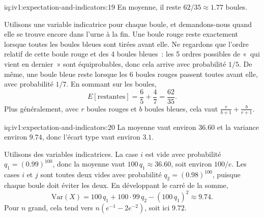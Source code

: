 \begin{solution}{iq:iv1:expectation-and-indicators:19}
En moyenne, il reste $62/35 \approx 1.77$ boules.

Utilisons une variable indicatrice pour chaque boule, et demandons-nous quand elle se trouve encore dans l'urne à la fin. Une boule rouge reste exactement lorsque toutes les boules bleues sont tirées avant elle. Ne regardons que
l'ordre relatif de cette boule rouge et des 4 boules bleues~: les 5 ordres possibles de «~qui vient en dernier~» sont équiprobables, donc cela arrive avec probabilité $1/5$. De même, une boule bleue reste lorsque les 6 boules rouges passent toutes avant elle, avec probabilité
$1/7$. En sommant sur les boules,
\[
E[\text{restantes}] = \frac{6}{5} + \frac{4}{7} = \frac{62}{35}.
\]
Plus généralement, avec $r$ boules rouges et $b$ boules bleues, cela vaut $\frac{r}{b+1} + \frac{b}{r+1}$.

\end{solution}

\begin{solution}{iq:iv1:expectation-and-indicators:20}
La moyenne vaut environ $36.60$ et la variance environ $9.74$, donc l'écart type vaut environ $3.1$.

Utilisons des variables indicatrices. La case $i$ est vide avec probabilité $q_1 = (0.99)^{100}$, donc la moyenne vaut $100\,q_1 \approx 36.60$, soit environ $100/e$. Les cases $i$ et $j$ sont toutes deux vides avec
probabilité $q_2 = (0.98)^{100}$, puisque chaque boule doit éviter les deux. En développant le carré de la somme,
\[
\mathrm{Var}(X) = 100\,q_1 + 100 \cdot 99\, q_2 - (100\,q_1)^2 \approx 9.74.
\]
Pour $n$ grand, cela tend vers $n(e^{-1} - 2e^{-2})$, soit ici $9.72$.

\end{solution}

